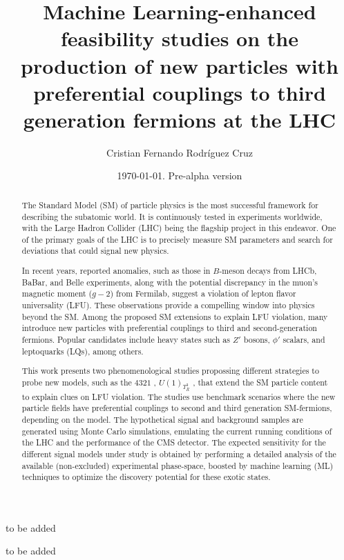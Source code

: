 \documentclass[11pt, letterpaper]{book}%
\title{Machine Learning-enhanced feasibility studies on the production of new particles with preferential couplings to third generation fermions at the LHC}
\author{Cristian Fernando Rodríguez Cruz}
\date{\today. Pre-alpha version}
\begin{document}
\frontmatter

\maketitle

\begin{dedication}
to be added
\end{dedication}

\begin{acknowledgements}
to be added
\end{acknowledgements}

\begin{abstract}
The Standard Model (SM) of particle physics is the most successful framework for describing the subatomic world. It is continuously tested in experiments worldwide, with the Large Hadron Collider (LHC) being the flagship project in this endeavor. One of the primary goals of the LHC is to precisely measure SM parameters and search for deviations that could signal new physics.  

In recent years, reported anomalies, such as those in $B$-meson decays from LHCb, BaBar, and Belle experiments, along with the potential discrepancy in the muon's magnetic moment ($g-2$) from Fermilab, suggest a violation of lepton flavor universality (LFU). These observations provide a compelling window into physics beyond the SM. Among the proposed SM extensions to explain LFU violation, many introduce new particles with preferential couplings to third and second-generation fermions. Popular candidates include heavy states such as $Z'$ bosons, $\phi'$ scalars, and leptoquarks (LQs), among others.

This work presents two phenomenological studies propossing different strategies to probe new models, such as the $4321$ \cite{Florez2023}, $U(1)_{T^3_R}$ \cite{Qureshi:2024naw}, that extend the SM particle content to explain clues on LFU violation. The studies use benchmark scenarios where the new particle fields have preferential couplings to second and third generation SM-fermions, depending on the model. The hypothetical signal and background samples are generated using Monte Carlo simulations, emulating the current running conditions of the LHC and the performance of the CMS detector. The expected sensitivity for the different signal models under study is obtained by performing a detailed analysis of the available (non-excluded) experimental phase-space, boosted by  machine learning (ML) techniques to optimize the discovery potential for these exotic states.
\end{abstract}
\end{document}
